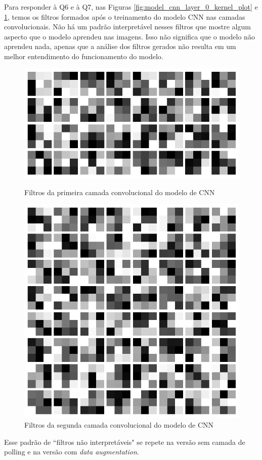 \documentclass[12pt]{article}
\begin{document}
Para responder à Q6 e à Q7, nas Figuras \ref{fig:model_cnn_layer_0_kernel_plot} e \ref{fig:model_cnn_layer_1_kernel_plot}, temos os filtros formados após o treinamento do modelo CNN nas camadas convolucionais. Não há um padrão interpretável nesses filtros que mostre algum aspecto que o modelo aprendeu nas imagens. Isso não significa que o modelo não aprendeu nada, apenas que a análise dos filtros gerados não resulta em um melhor entendimento do funcionamento do modelo.

\begin{figure}[H]
  \centering
  \begin{minipage}{0.5\textwidth}
    \centering
    \includegraphics[width=.5\textwidth]{../images/kernels_plt/model_cnn_layer_0_kernel_plot.png}
    \caption{Filtros da primeira camada convolucional do modelo de CNN}
    \label{fig:model_cnn_layer_0_kernel_plot}
  \end{minipage}%
  \hfill
  \begin{minipage}{0.5\textwidth}
    \centering
    \includegraphics[width=.5\textwidth]{../images/kernels_plt/model_cnn_layer_1_kernel_plot.png}
    \caption{Filtros da segunda camada convolucional do modelo de CNN}
    \label{fig:model_cnn_layer_1_kernel_plot}
  \end{minipage}
  \end{figure}

  Esse padrão de ``filtros não interpretáveis" se repete  na versão sem camada de polling e na versão com \textit{data augmentation}.
\end{document}
